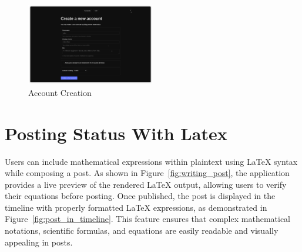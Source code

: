 \begin{figure}[h!]
    \centering
    \includegraphics[width=0.5\textwidth]{Graphics/accountcreation.png}
    \caption{Account Creation}
    \label{fig:account_creation}
\end{figure}

\section{Posting Status With Latex}

Users can include mathematical expressions within plaintext using LaTeX syntax while composing a post. As shown in Figure~\ref{fig:writing_post}, the application provides a live preview of the rendered LaTeX output, allowing users to verify their equations before posting. Once published, the post is displayed in the timeline with properly formatted LaTeX expressions, as demonstrated in Figure~\ref{fig:post_in_timeline}. This feature ensures that complex mathematical notations, scientific formulas, and equations are easily readable and visually appealing in posts.

